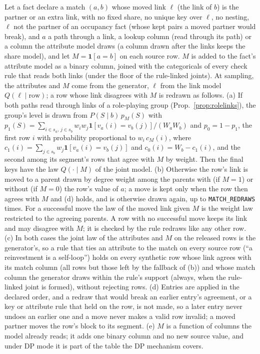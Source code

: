 \setcounter{proposition}{1870}
\begin{proposition}\label{prop:matchrows}
Let a fact declare a match $(a,b)$ whose moved link $\ell$ (the link of $b$) is the partner or an extra link, with no fixed share, no unique key over $\ell$, no nesting, $\ell$ not the partner of an occupancy fact (whose kept pairs a moved partner would break), and $a$ a path through a link, a lookup column (read through its path) or a column the attribute model draws (a column drawn after the links keeps the share model), and let $M=\mathbf 1[a=b]$ on each source row. $M$ is added to the fact's attribute model as a binary column, joined with the categoricals of every check rule that reads both links (under the floor of the rule-linked joints). At sampling, the attributes and $M$ come from the generator, $\ell$ from the link model $Q(\ell\mid\text{row})$; a row whose link disagrees with $M$ is redrawn as follows. (a) If both paths read through links of a role-playing group (Prop.~\ref{prop:rolelinks}), the group's level is drawn from $P(S\mid b)\,p_M(S)$ with $p_1(S)=\sum_{i\in s_a,\,j\in s_b}w_iw_j\mathbf 1[v_a(i)=v_b(j)]/(W_aW_b)$ and $p_0=1-p_1$, the first row $i$ with probability proportional to $w_i\,c_M(i)$, where $c_1(i)=\sum_{j\in s_b}w_j\mathbf 1[v_a(i)=v_b(j)]$ and $c_0(i)=W_b-c_1(i)$, and the second among its segment's rows that agree with $M$ by weight. Then the final keys have the law $Q(\cdot\mid M)$ of the joint model. (b) Otherwise the row's link is moved to a parent drawn by degree weight among the parents with (if $M=1$) or without (if $M=0$) the row's value of $a$; a move is kept only when the row then agrees with $M$ and (d) holds, and is otherwise drawn again, up to \texttt{MATCH\_REDRAWS} times. For a successful move the law of the moved link given $M$ is the weight law restricted to the agreeing parents. A row with no successful move keeps its link and may disagree with $M$; it is checked by the rule redraws like any other row. (c) In both cases the joint law of the attributes and $M$ on the released rows is the generator's, so a rule that ties an attribute to the match on every source row (``a reinvestment is a self-loop'') holds on every synthetic row whose link agrees with its match column (all rows but those left by the fallback of (b)) and whose match column the generator draws within the rule's support (always, when the rule-linked joint is formed), without rejecting rows. (d) Entries are applied in the declared order, and a redraw that would break an earlier entry's agreement, or a key or attribute rule that held on the row, is not made, so a later entry never undoes an earlier one and a move never makes a valid row invalid; a moved partner moves the row's block to its segment. (e) $M$ is a function of columns the model already reads; it adds one binary column and no new source value, and under DP mode it is part of the table the DP mechanism covers.
\end{proposition}
